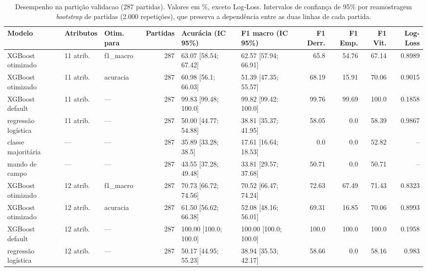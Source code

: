 \begin{table}[htbp]
\centering
\caption{Desempenho na partição validacao (287 partidas). Valores em \%, exceto Log-Loss. Intervalos de confiança de 95\% por reamostragem \emph{bootstrap} de partidas (2.000 repetições), que preserva a dependência entre as duas linhas de cada partida.}
\label{tab:wp3-validacao}
\small
\begin{tabular}{lllrllrrrr}
\toprule
Modelo & Atributos & Otim. para & Partidas & Acurácia (IC 95\%) & F1 macro (IC 95\%) & F1 Derr. & F1 Emp. & F1 Vit. & Log-Loss \\
\midrule
XGBoost otimizado & 11 atrib. & f1\_macro & 287 & 63.07 [58.54; 67.42] & 62.57 [57.94; 66.91] & 65.8 & 54.76 & 67.14 & 0.8989 \\
XGBoost otimizado & 11 atrib. & acuracia & 287 & 60.98 [56.1; 66.03] & 51.39 [47.35; 55.57] & 68.19 & 15.91 & 70.06 & 0.9015 \\
XGBoost default & 11 atrib. & — & 287 & 99.83 [99.48; 100.0] & 99.82 [99.42; 100.0] & 99.76 & 99.69 & 100.0 & 0.1858 \\
regressão logística & 11 atrib. & — & 287 & 50.00 [44.77; 54.88] & 38.81 [35.37; 41.95] & 58.05 & 0.0 & 58.39 & 0.9867 \\
classe majoritária & — & — & 287 & 35.89 [33.28; 38.5] & 17.61 [16.64; 18.53] & 0.0 & 0.0 & 52.82 & -- \\
mando de campo & — & — & 287 & 43.55 [37.28; 49.48] & 33.81 [29.57; 37.68] & 50.71 & 0.0 & 50.71 & -- \\
XGBoost otimizado & 12 atrib. & f1\_macro & 287 & 70.73 [66.72; 74.56] & 70.52 [66.47; 74.24] & 72.63 & 67.49 & 71.43 & 0.8323 \\
XGBoost otimizado & 12 atrib. & acuracia & 287 & 61.50 [56.62; 66.38] & 52.08 [48.16; 56.01] & 69.31 & 16.85 & 70.06 & 0.8993 \\
XGBoost default & 12 atrib. & — & 287 & 100.00 [100.0; 100.0] & 100.00 [100.0; 100.0] & 100.0 & 100.0 & 100.0 & 0.1958 \\
regressão logística & 12 atrib. & — & 287 & 50.17 [44.95; 55.23] & 38.94 [35.53; 42.17] & 58.66 & 0.0 & 58.16 & 0.983 \\
\bottomrule
\end{tabular}
\end{table}
